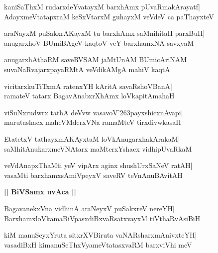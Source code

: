 \documentclass[twoside,12pt,openright]{book}
\def\S{\char'263}
\newcounter{shloka}[chapter]
\def\uvaca#1{\centerline{{\large\textbf{#1}}}}
\begin{document}
\begin{shloka}%
kaniSaThxM rudarxdeYvatayxM barxhAmx pUvaRmakArayatf|\\
AdayxmeVtatapxraM keSxVtarxM guhayxM veVdeV ca paThayxteV
\end{shloka}

\begin{shloka}%
araNayxM puSakxrAKayxM tu barxhAmx saMnihitaH parxBuH|\\
anugarxhoV BUmiBAgeV kaqtoV veY barxhamxNA savxyaM
\end{shloka}

\begin{shloka}%
anugarxhAthaRM saveRVSAM jaMtUnAM BUmicAriNAM\\
suvaNaRvajarxpayaRMtA veVdikAMgA mahiV kaqtA
\end{shloka}

\begin{shloka}%
vicitarxkuTiTxmA ratenxYH kAritA savaRshoVBanA|\\
ramateV tatarx BagavAnabxrXhAmx loVkapitAmahaH
\end{shloka}

\begin{shloka}%
viSuNxrudwrx tathA deVvw vasavoV\S payxshicxnAvapi|\\
marutashacx maheVMderxVNa ramaMteV tirxdivwkasaH
\end{shloka}

\begin{shloka}%
EtatetxV tathayxmAKAyxtaM loVkAnugarxhakArakaM|\\
saMhitAnukarxmeVNAtarx maMterxYshacx vidhipUvaRkaM
\end{shloka}

\begin{shloka}%
veVdAnapxThaMti yeV vipArx aginx shushUrxSaNeV ratAH|\\
vasaMti barxhamxsAmiVpeyxV saveRV teVnAnuBAvitAH
\end{shloka}

\uvaca{|| BiVSamx uvAca ||}
\begin{shloka}%
BagavanekxVna vidhinA araNeyxV puSakxreV nereYH|\\
BarxhamxloVkamaBiVpasxdiBxvaRsatxvayxM tiVthaRvAsiBiH
\end{shloka}

\begin{shloka}%
kiM manuSeyxYruta sitxrXVBiruta vaNARsharxmAnivxteYH|\\
vasadiBxH kimanuSeThxVyameVtatasxvaRM barxviVhi meV
\end{shloka}
\end{document}
